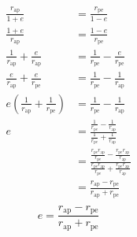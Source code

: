 \documentclass{article}
\begin{document}
\begin{align*}
    \frac{r_\text{ap}}{1+e}                                   & =\frac{r_\text{pe}}{1-e}                                                                                                                                                             \\
    \frac{1+e}{r_\text{ap}}                                   & =\frac{1-e}{r_\text{pe}}                                                                                                                                                             \\
    \frac{1}{r_\text{ap}}+\frac{e}{r_\text{ap}}               & =\frac{1}{r_\text{pe}}-\frac{e}{r_\text{pe}}                                                                                                                                         \\
    \frac{e}{r_\text{ap}}+\frac{e}{r_\text{pe}}               & =\frac{1}{r_\text{pe}}-\frac{1}{r_\text{ap}}                                                                                                                                         \\
    e\left(\frac{1}{r_\text{ap}}+\frac{1}{r_\text{pe}}\right) & =\frac{1}{r_\text{pe}}-\frac{1}{r_\text{ap}}                                                                                                                                         \\
    e                                                         & =\frac{\frac{1}{r_\text{pe}}-\frac{1}{r_\text{ap}}}{\frac{1}{r_\text{pe}}+\frac{1}{r_\text{ap}}}                                                                                     \\
                                                              & =\frac{\frac{r_\text{pe}r_\text{ap}}{r_\text{pe}}-\frac{r_\text{pe}r_\text{ap}}{r_\text{ap}}}{\frac{r_\text{pe}r_\text{ap}}{r_\text{pe}}+\frac{r_\text{pe}r_\text{ap}}{r_\text{ap}}} \\
                                                              & =\frac{r_\text{ap}-r_\text{pe}}{r_\text{ap}+r_\text{pe}}                                                                                                                             \\
\end{align*}
\begin{equation}\label{Accentricity in terms of apses}
    e=\frac{r_\text{ap}-r_\text{pe}}{r_\text{ap}+r_\text{pe}}
\end{equation}
\end{document}

